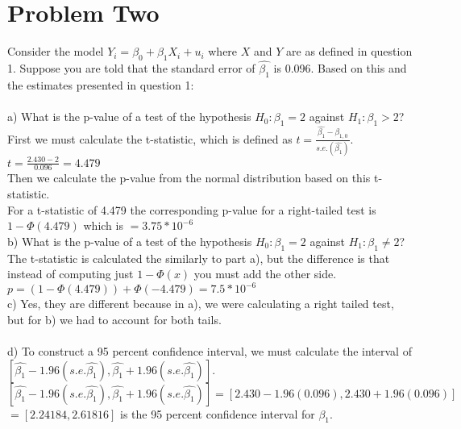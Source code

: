 \documentclass[11pt, oneside]{article}   	%
\begin{document}
\section{Problem Two}
Consider the model $Y_i = \beta_0 + \beta_1X_i + u_i$ where $X$ and $Y$ are as defined in question 1. Suppose you are told that the standard error of $\hat{\beta_1}$ is 0.096. Based on this and the estimates presented in question 1:\\~\\
a) What is the p-value of a test of the hypothesis $H_0: \beta_1 = 2$ against $H_1: \beta_1 >2$?\\
First we must calculate the t-statistic, which is defined as $t = \frac{\hat{\beta_1} - \beta_{1,0}}{s.e.(\hat{\beta_1})}$.\\
$t = \frac{2.430 - 2}{0.096} = 4.479$\\
Then we calculate the p-value from the normal distribution based on this t-statistic.\\
For a t-statistic of 4.479 the corresponding p-value for a right-tailed test is $1 - \Phi(4.479)$ which is $= 3.75 * 10^{-6}$\\
b) What is the p-value of a test of the hypothesis $H_0: \beta_1 = 2$ against $H_1: \beta_1 \neq 2$?\\
The t-statistic is calculated the similarly to part a), but the difference is that instead of computing just $1 - \Phi(x)$ you must add the other side.\\
$p = (1-\Phi(4.479)) + \Phi(-4.479) = 7.5 * 10^{-6}$\\
c) Yes, they are different because in a), we were calculating a right tailed test, but for b) we had to account for both tails. \\~\\
d) To construct a 95 percent confidence interval, we must calculate the interval of $[\hat{\beta_1} - 1.96(s.e. \hat{\beta_1}), \hat{\beta_1} + 1.96(s.e. \hat{\beta_1})]$.\\
$[\hat{\beta_1} - 1.96(s.e. \hat{\beta_1}), \hat{\beta_1} + 1.96(s.e. \hat{\beta_1})] = [2.430 - 1.96(0.096), 2.430 + 1.96(0.096)]$\\
$ = [2.24184, 2.61816]$ is the 95 percent confidence interval for $\beta_1$.\\
\end{document}
